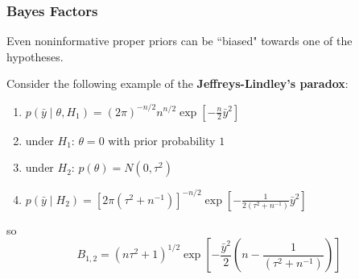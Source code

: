 \documentclass{beamer}
\begin{document}
\begin{frame}
\frametitle{Bayes Factors}

Even noninformative proper priors can be ``biased" towards one of the hypotheses. 
\newline


Consider the following example of the {\bf Jeffreys-Lindley's paradox}: 
\begin{enumerate}
\item $p(\bar{y} \mid \theta, H_1)  = (2\pi)^{-n/2}n^{n/2} \exp\left[-\frac{n}{2}\bar{y}^2 \right]$
\item under $H_1$: $\theta = 0$ with prior probability $1$
\item under $H_2$: $p(\theta) = N(0,\tau^2)$
\item $p(\bar{y} \mid H_2) = [2\pi(\tau^2 + n^{-1})]^{-n/2} \exp\left[-\frac{1}{2(\tau^2 + n^{-1})}\bar{y}^2 \right]$
\end{enumerate}
so
\[
B_{1,2} = (n\tau^2 + 1)^{1/2} \exp\left[-\frac{\bar{y}^2}{2}\left(n - \frac{1}{(\tau^2 + n^{-1})}\right) \right]
\]


\end{frame}
\end{document}
